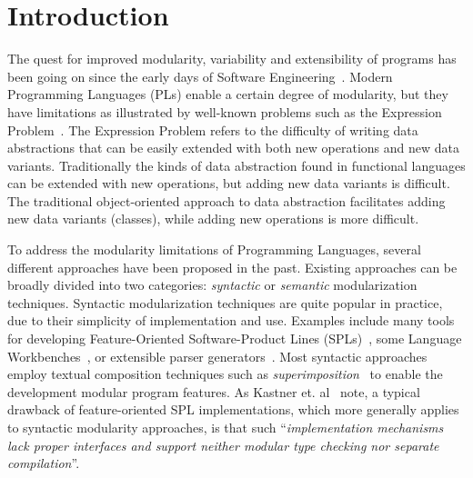 \section{Introduction}\label{sec:introduction}

The quest for improved modularity, variability and extensibility of
programs has been going on since the early days of Software
Engineering~\cite{McIlroy68}. Modern Programming Languages (PLs) enable a certain
degree of modularity, but they have limitations as illustrated by
well-known problems such as the Expression Problem~\cite{wadler1998expression}. The
Expression Problem refers to the difficulty of writing data
abstractions that can be easily extended with both new operations and
new data variants. Traditionally the kinds of data abstraction found
in functional languages can be extended with new operations, but
adding new data variants is difficult. The traditional object-oriented
approach to data abstraction facilitates adding new data variants
(classes), while adding new operations is more difficult.

To address the modularity limitations of Programming Languages, several
different approaches have been proposed in the past. Existing
approaches can be broadly divided into two categories:
\emph{syntactic} or \emph{semantic} modularization
techniques. Syntactic modularization techniques are quite popular in
practice, due to their simplicity of implementation and use.
Examples include many tools for developing Feature-Oriented Software-Product
Lines (SPLs)~\cite{AK:JOT09,Kastner11road}, some Language Workbenches~\cite{Erdweg201524}, or extensible parser
generators~\cite{antlr1995,Grimm2006,Gouseti2014,Warth2016}.  Most syntactic approaches employ textual
composition techniques such as \emph{superimposition}~\cite{AK:JOT09} to
enable the development modular program features.
As Kastner et. al~\cite{Kastner11road} note,
a typical drawback of feature-oriented SPL implementations, which
more generally applies to syntactic modularity approaches, is that
such ``\emph{implementation mechanisms lack proper
  interfaces and support neither modular type checking nor separate
  compilation}''.

\begin{comment}
Syntactic modularization techniques have also been applied to the
problem of \emph{extensible parsing}. Many parser
generators~\cite{antlr1995,Grimm2006,Gouseti2014,Warth2016} support
modular grammars. For instance, \textit{Rats!}~\cite{Grimm2006} has
its own module system for the collection of grammars.  Extensible
compilers like JastAdd~\cite{Ekman2007} and
Polyglot~\cite{Nystrom2003} also support extensible parsing, but this
is mostly done ultimately resorting to standard (non-modular) parser
generators. Various techniques supporting languages that can extend
their own syntax, such as SugarJ~\cite{Erdweg2011}, also offer a form
of extensible parsing. However those syntactic approaches do not
support separate compilation and/or modular type-checking
of parsing code either.
\end{comment}

